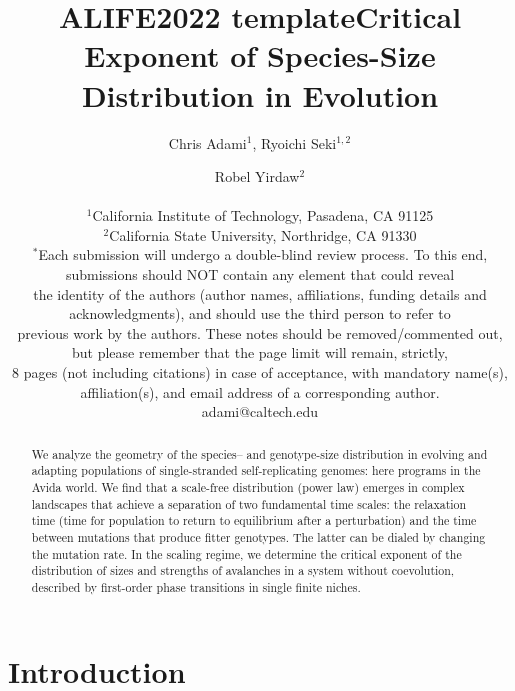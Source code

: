 \documentclass[letterpaper]{article}
\title{ALIFE2022 template}
\title{Critical Exponent of Species-Size Distribution in Evolution}
\author{Chris Adami$^{1}$, Ryoichi Seki$^{1,2}$ \and Robel Yirdaw$^2$ \\
\mbox{}\\
$^1$California Institute of Technology, Pasadena, CA 91125 \\
$^2$California State University, Northridge, CA 91330 \\
$^*$Each submission will undergo a double-blind review process. To this end, submissions should NOT contain any element that could reveal \\ the identity of the authors (author names, affiliations, funding details and acknowledgments), and should use the third person to refer to \\ previous work by the authors. These notes should be removed/commented out, but please remember that the page limit will remain, strictly, \\8 pages (not including citations) in case of acceptance, with mandatory name(s), affiliation(s), and email address of a corresponding author. \\
adami@caltech.edu} %
\begin{document}
\maketitle

\begin{abstract}
  We analyze the geometry of the species-- and genotype-size
  distribution in evolving and adapting populations of single-stranded
  self-replicating genomes: here programs in the Avida world.  We find
  that a scale-free distribution (power law) emerges in complex
  landscapes that achieve a separation of two fundamental time scales:
  the relaxation time (time for population to return to equilibrium
  after a perturbation) and the time between mutations that produce
  fitter genotypes. The latter can be dialed by changing the mutation
  rate.  In the scaling regime, we determine the
  critical exponent of the distribution of sizes and strengths of
  avalanches in a system without coevolution, described by first-order
  phase transitions in single finite niches.
\end{abstract}

\section{Introduction}
\end{document}

